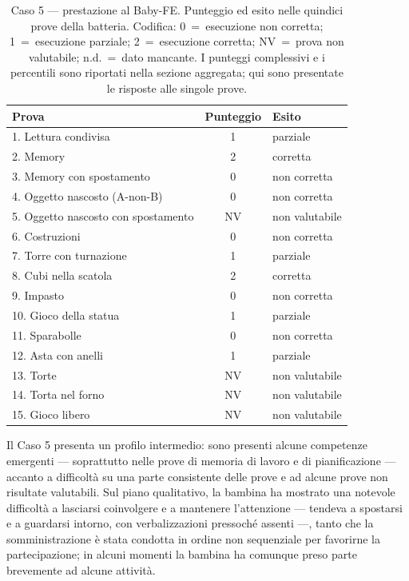 \begin{table}[htbp]
\centering
\caption[Caso 5 --- prestazione al Baby-FE]{Caso 5 --- prestazione al Baby-FE. Punteggio ed esito nelle quindici prove della batteria. Codifica: 0~=~esecuzione non corretta; 1~=~esecuzione parziale; 2~=~esecuzione corretta; NV~=~prova non valutabile; n.d.~=~dato mancante. I punteggi complessivi e i percentili sono riportati nella sezione aggregata; qui sono presentate le risposte alle singole prove.}
\label{tab:caso5_prove}
\begin{tabular}{|l|c|l|}
\toprule
\textbf{Prova} & \textbf{Punteggio} & \textbf{Esito} \\
\midrule
1. Lettura condivisa & 1 & parziale \\
2. Memory & 2 & corretta \\
3. Memory con spostamento & 0 & non corretta \\
4. Oggetto nascosto (A-non-B) & 0 & non corretta \\
5. Oggetto nascosto con spostamento & NV & non valutabile \\
6. Costruzioni & 0 & non corretta \\
7. Torre con turnazione & 1 & parziale \\
8. Cubi nella scatola & 2 & corretta \\
9. Impasto & 0 & non corretta \\
10. Gioco della statua & 1 & parziale \\
11. Sparabolle & 0 & non corretta \\
12. Asta con anelli & 1 & parziale \\
13. Torte & NV & non valutabile \\
14. Torta nel forno & NV & non valutabile \\
15. Gioco libero & NV & non valutabile \\
\bottomrule
\end{tabular}
\end{table}

Il Caso 5 presenta un profilo intermedio: sono presenti alcune competenze emergenti --- soprattutto nelle prove di memoria di lavoro e di pianificazione --- accanto a difficoltà su una parte consistente delle prove e ad alcune prove non risultate valutabili. Sul piano qualitativo, la bambina ha mostrato una notevole difficoltà a lasciarsi coinvolgere e a mantenere l'attenzione --- tendeva a spostarsi e a guardarsi intorno, con verbalizzazioni pressoché assenti ---, tanto che la somministrazione è stata condotta in ordine non sequenziale per favorirne la partecipazione; in alcuni momenti la bambina ha comunque preso parte brevemente ad alcune attività.

